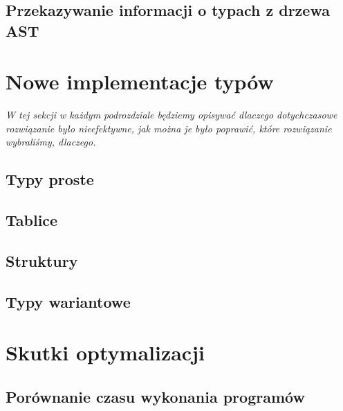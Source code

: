 \documentclass[11pt]{article}
\begin{document}
    \subsection{Przekazywanie informacji o typach z drzewa AST}

    \section{Nowe implementacje typów}
    \emph{W tej sekcji w każdym podrozdziale będziemy opisywać dlaczego
          dotychczasowe rozwiązanie było nieefektywne, jak można je
          było poprawić, które rozwiązanie wybraliśmy, dlaczego.}
    \subsection{Typy proste}
    \subsection{Tablice}
    \subsection{Struktury}
    \subsection{Typy wariantowe}

    \section{Skutki optymalizacji}
    \subsection{Porównanie czasu wykonania programów}
\end{document}
